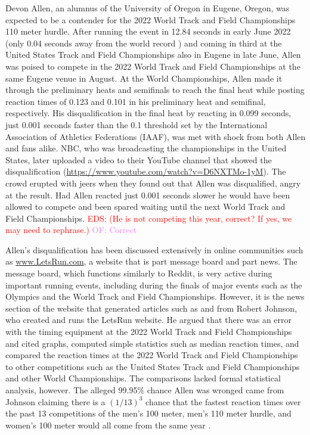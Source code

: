 \documentclass[12pt, letterpaper, titlepage]{article}
\newcommand{\eds}[1]{\textcolor{red}{EDS: (#1)}}
\newcommand{\of}[1]{\textcolor{violet}{OF: #1}}
\begin{document}
Devon Allen, an alumnus of the University of Oregon in 
Eugene, Oregon, was
expected to be a contender for the 2022 World Track and Field Championships 110 
meter hurdle.  After running the event in 12.84 seconds in early June 2022 
(only 0.04 seconds away from the world record \citep{wa2022preview}) and coming 
in third at the United States Track and Field 
Championships also in Eugene in late June, Allen was poised to compete in the 
2022 World Track and Field Championships at the same Eugene venue in August.
At the World Championships, Allen made it through the preliminary
heats and semifinals to reach the final heat while posting reaction times of 
0.123 and 0.101 in his preliminary heat and semifinal, respectively.  
His disqualification in the final heat by reacting in 0.099 seconds, just 0.001
seconds faster than the 0.1 threshold set by the International Association of
Athletics Federations (IAAF), was met
with shock from both Allen and fans alike.  NBC, who was broadcasting the
championships in the United States, later uploaded a video to their YouTube
channel that showed the disqualification
(\url{https://www.youtube.com/watch?v=D6NXTMo-1yM}).
The crowd erupted with jeers
when they found out that Allen was disqualified, angry at the result.  Had Allen 
reacted just 0.001 seconds slower he would have been allowed to compete and been 
spared waiting until the next World Track and Field Championships.
\eds{He is not competing this year, correct? If yes, we may need to rephrase.}
\of{Correct}


Allen's disqualification has been discussed extensively in online communities
such as \url{www.LetsRun.com}, a website that is part message board and part
news. The message board,
which functions similarly to Reddit, is very active during important running
events, including during the finals of major events such as
the Olympics and the World Track and Field Championships.  However, it is the
news section of the website that generated articles such as \citet{johnson2022data}
and \citet{johnson2022was} from  Robert Johnson, who created and runs 
the LetsRun website.  He argued that there was an error
with the timing equipment at the 2022 World Track and Field Championships and
cited graphs, computed simple statistics such as median reaction times, and 
compared the reaction times at the 2022 World Track and Field Championships to 
other competitions
such as the United States Track and Field Championships and other World Championships.
The comparisons lacked formal statistical analysis, however. 
The alleged 99.95\% chance Allen was wronged 
came from Johnson claiming there is a $(1/13)^3$ chance that the fastest 
reaction times over the past 13 competitions of the men's 100 meter, men's 110 
meter hurdle, and women's 100 meter would all come from the same year 
\citep{johnson2022was}.
\end{document}
